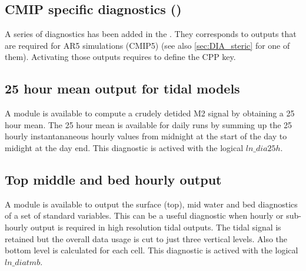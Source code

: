 \documentclass[../main/NEMO_manual]{subfiles}
\begin{document}
\subsection{CMIP specific diagnostics (\protect{})}

A series of diagnostics has been added in the .
They corresponds to outputs that are required for AR5 simulations (CMIP5)
(see also \autoref{sec:DIA_steric} for one of them).
Activating those outputs requires to define the  CPP key.

\subsection{25 hour mean output for tidal models}



A module is available to compute a crudely detided M2 signal by obtaining a 25 hour mean.
The 25 hour mean is available for daily runs by summing up the 25 hourly instantananeous hourly values from
midnight at the start of the day to midight at the day end.
This diagnostic is actived with the logical $ln\_dia25h$.

\subsection{Top middle and bed hourly output}



A module is available to output the surface (top), mid water and bed diagnostics of a set of standard variables.
This can be a useful diagnostic when hourly or sub-hourly output is required in high resolution tidal outputs.
The tidal signal is retained but the overall data usage is cut to just three vertical levels.
Also the bottom level is calculated for each cell.
This diagnostic is actived with the logical $ln\_diatmb$.
\end{document}

